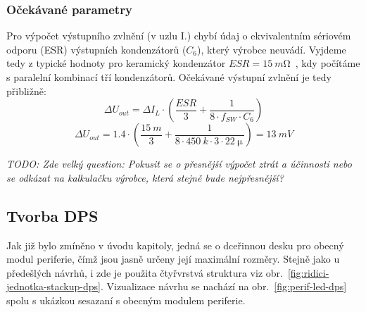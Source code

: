 \subsubsection{Očekávané parametry}
    Pro výpočet výstupního zvlnění (v uzlu I.) chybí údaj o ekvivalentním sériovém odporu (ESR) výstupních kondenzátorů (\(C_{6} \)), který výrobce neuvádí. Vyjdeme tedy z typické hodnoty pro keramický kondenzátor \(ESR=\qty{15}{m\ohm}\)~\cite{wikipedia2024esr}, kdy počítáme s paralelní kombinací tří kondenzátorů.
    Očekávané výstupní zvlnění je tedy přibližně:
    \begin{equation}
        \Delta U_{out} = \Delta I_{L} \cdot  \left(\frac{ESR}{3}+\frac{1}{8\cdot f_{SW} \cdot C_{6} }\right) 
    \end{equation} 
    \begin{equation}
        \Delta U_{out} = \num{1.4} \cdot  \left(\frac{\qty{15}{m}}{3}+\frac{1}{8\cdot \qty{450}{k} \cdot 3\cdot \qty{22}{\micro\,} }\right)  = \qty{13}{mV}
    \end{equation} 

    \textit{TODO: Zde velký question: Pokusit se o přesnější výpočet ztrát a účinnosti nebo se odkázat na kalkulačku výrobce, která stejně bude nejpřesnější?}

\subsection{Tvorba DPS}
    Jak již bylo zmíněno v úvodu kapitoly, jedná se o dceřinnou desku pro obecný modul periferie, čímž jsou jasně určeny její maximální rozměry. Stejně jako u předešlých návrhů, i zde je použita čtyřvrstvá struktura viz obr.~\ref{fig:ridici-jednotka-stackup-dps}. Vizualizace návrhu se nachází na obr.~\ref{fig:perif-led-dps} spolu s ukázkou sesazaní s obecným modulem periferie. 


